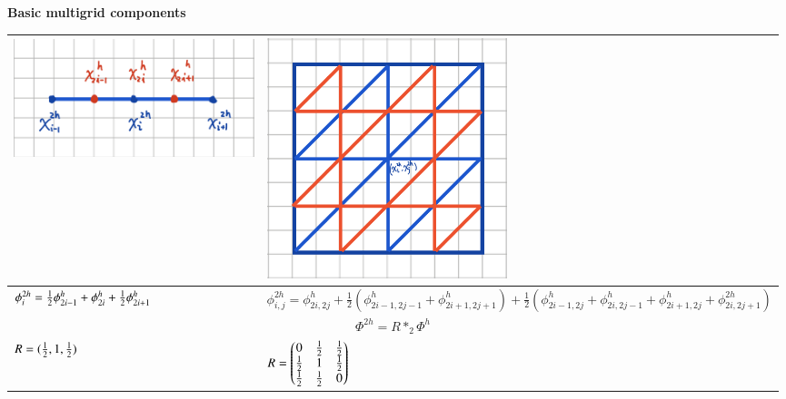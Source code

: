 \renewcommand\arraystretch{2}
\begin{table}[]
\centerline{\bf Basic multigrid components}
\medskip 
\centering
\begin{tabular}{ p{7cm}<{\centering}|p{7cm}<{\centering}}
\hline 
 \begin{minipage}{0.5\textwidth}
      	\includegraphics[width=7cm,height=3.5cm]{figures/two-grids1.png}
   	 \end{minipage}
    & \begin{minipage}{0.5\textwidth}
      	\includegraphics[width=7cm,height=7cm]{figures/two-grids2.png}
   	 \end{minipage} 
\\\hline
  $\phi_{i}^{2h}={1\over 2} \phi_{2i-1}^{h} + \phi_{2i}^{h} + {1\over 2} \phi_{2i+1}^{h}$        &     { \small$ \phi_{i,j}^{2h} =\phi_{2i,2j}^{h} 
+\frac{1}{2}\left(\phi_{2i-1,2j-1}^{h} +\phi_{2i+1,2j+1}^{h} \right)
+\frac{1}{2}\left(\phi_{2i-1,2j}^{h} +\phi_{2i,2j-1}^{h} 
+\phi_{2i+1,2j}^{h} +\phi_{2i,2j+1}^{2h} \right)$}
      \\\hline
  \multicolumn{2}{c}{ $\Phi^{2h}=R\ast_2 \Phi^h$  }    \\\hline
 $R=({1\over 2}, 1, {1\over 2})$      &   $R=\begin{pmatrix}
0&{1\over 2}&{1\over 2}\\
{1\over 2}&1&{1\over 2}\\
{1\over 2}&{1\over 2}&0
\end{pmatrix}$       \\\hline
\end{tabular}
\end{table}

\clearpage



